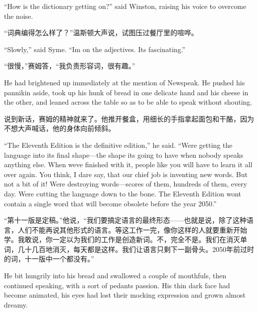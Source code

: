\begin{paracol}{2}
\switchcolumn*

``How is the dictionary getting on?'' said Winston, raising his voice to
overcome the noise.

\switchcolumn

``词典编得怎么样了？''温斯顿大声说，试图压过餐厅里的喧哗。

\switchcolumn*

``Slowly,'' said Syme. ``I\textquotesingle m on the adjectives.
It\textquotesingle s fascinating.''

\switchcolumn

``很慢，''赛姆答，``我负责形容词，很有趣。''

\switchcolumn*

He had brightened up immediately at the mention of Newspeak. He pushed
his pannikin aside, took up his hunk of bread in one delicate hand and
his cheese in the other, and leaned across the table so as to be able to
speak without shouting.

\switchcolumn

说到新话，赛姆的精神就来了。他推开餐盒，用细长的手指拿起面包和干酪，因为不想大声喊话，他的身体向前倾斜。

\switchcolumn*

``The Eleventh Edition is the definitive edition,'' he said.
``We\textquotesingle re getting the language into its final shape---the
shape it\textquotesingle s going to have when nobody speaks anything
else. When we\textquotesingle ve finished with it, people like you will
have to learn it all over again. You think, I dare say, that our chief
job is inventing new words. But not a bit of it! We\textquotesingle re
destroying words---scores of them, hundreds of them, every day.
We\textquotesingle re cutting the language down to the bone. The
Eleventh Edition won\textquotesingle t contain a single word that will
become obsolete before the year 2050.''

\switchcolumn

``第十一版是定稿。''他说，``我们要搞定语言的最终形态——也就是说，除了这种语言，人们不能再说其他形式的语言。等这工作一完，像你这样的人就要重新开始学。我敢说，你一定以为我们的工作是创造新词。不，完全不是。我们在消灭单词，几十几百地消灭，每天都是这样。我们让语言只剩下一副骨头。2050年前过时的词，十一版中一个都没有。''

\switchcolumn*

He bit hungrily into his bread and swallowed a couple of mouthfuls, then
continued speaking, with a sort of pedant\textquotesingle s passion. His
thin dark face had become animated, his eyes had lost their mocking
expression and grown almost dreamy.


\end{paracol}
